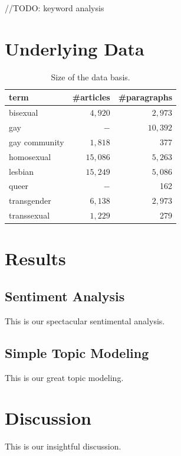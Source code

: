 \documentclass[10pt,a4paper,twocolumn]{scrartcl}
\begin{document}
//TODO: keyword analysis

\section{Underlying Data}

\begin{table}
\centering
\caption{Size of the data basis.}
\begin{tabular}{lrr}
\toprule
term	 & \#articles & \#paragraphs\\
\midrule
bisexual &  $4,920$ & $2,973$\\
gay			& $-$ & $10,392$\\
gay community & $1,818$ & 377\\
homosexual  & $15,086$ & $5,263$\\
lesbian & $15,249$ & $5,086$\\
queer  & $-$ & 162\\
transgender  & $6,138$ & $2,973$\\
transsexual  & $1,229$ & 279\\
\bottomrule
\end{tabular}
\end{table}


\section{Results}

\subsection{Sentiment Analysis}
This is our spectacular sentimental analysis.

\subsection{Simple Topic Modeling}
This is our great topic modeling.

\section{Discussion}
This is our insightful discussion.
\end{document}
